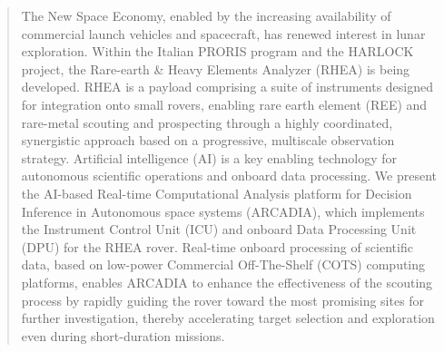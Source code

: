 \documentclass[11pt,twoside]{article}
\begin{document}



\begin{abstract}
The New Space Economy, enabled by the increasing availability of commercial launch vehicles and spacecraft, has renewed interest in lunar exploration. Within the Italian PRORIS program and the HARLOCK project, the Rare-earth \& Heavy Elements Analyzer (RHEA) is being developed. RHEA is a payload comprising a suite of instruments designed for integration onto small rovers, enabling rare earth element (REE) and rare-metal scouting and prospecting through a highly coordinated, synergistic approach based on a progressive, multiscale observation strategy. Artificial intelligence (AI) is a key enabling technology for autonomous scientific operations and onboard data processing. We present the AI-based Real-time Computational Analysis platform for Decision Inference in Autonomous space systems (ARCADIA), which implements the Instrument Control Unit (ICU) and onboard Data Processing Unit (DPU) for the RHEA rover. Real-time onboard processing of scientific data, based on low-power Commercial Off-The-Shelf (COTS) computing platforms, enables ARCADIA to enhance the effectiveness of the scouting process by rapidly guiding the rover toward the most promising sites for further investigation, thereby accelerating target selection and exploration even during short-duration missions.
\end{abstract}

\end{document}
